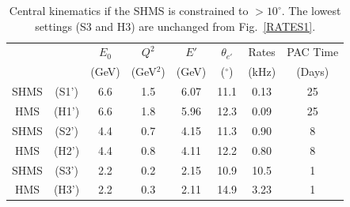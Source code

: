 \begin{table}
\begin{center}
\begin{tabular}{cc|c|c|c|c|c|c}
 & & $E_0$ & $Q^2$    	& $E'$  &    $\theta_{e'}$  &  Rates   & PAC Time   \\
& & (GeV) & (GeV$^2$)  & (GeV)  &     ($^{\circ}$)   &   (kHz)  & (Days) \\
\hline\hline
SHMS & (S1') & 6.6	&  1.5	&  6.07	&    11.1  	&    0.13	&   25 \\
HMS  & (H1') & 6.6	&  1.8	&  5.96	&    12.3	&    0.09	&   25 \\  
SHMS & (S2') & 4.4	&  0.7	&  4.15	&    11.3 	&    0.90	&   8 \\
HMS  & (H2') & 4.4	&  0.8	&  4.11	&    12.2	&    0.80	&   8 \\
SHMS & (S3') & 2.2	&  0.2	&  2.15	&    10.9 	&    10.5	&   1 \\
HMS  & (H3') & 2.2	&  0.3	&  2.11	&    14.9	&    3.23	&   1 \\  
\hline\hline
\end{tabular}
\caption{\label{RATES1-const}Central kinematics if the SHMS is constrained to $>10^{\circ}$. The lowest settings (S3 and H3) are unchanged from Fig.~\ref{RATES1}.}
\end{center}
\end{table}

%


